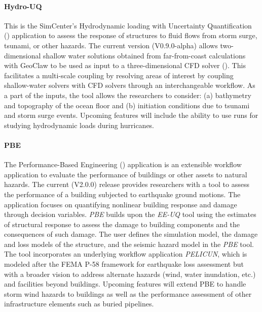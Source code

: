 \paragraph{Hydro-UQ} This is the SimCenter's Hydrodynamic loading with Uncertainty Quantification () application to assess the response of structures to fluid flows from storm surge, tsunami, or other hazards. The current version (V0.9.0-alpha) allows two-dimensional shallow water solutions obtained from far-from-coast calculations with GeoClaw  to be used as input to a three-dimensional CFD solver (). This facilitates a multi-scale coupling by resolving areas of interest by coupling shallow-water solvers with CFD solvers through an interchangeable workflow. As a part of the inputs, the tool allows the researchers to consider: (a) bathymetry and topography of the ocean floor and (b) initiation conditions due to tsunami and storm surge events. Upcoming features will include the ability to use  runs for studying hydrodynamic loads during hurricanes.

\paragraph{PBE} The Performance-Based Engineering () application is an extensible workflow application to evaluate the performance of buildings or other assets to natural hazards. The current (V2.0.0) release provides researchers with a tool to assess the performance of a building subjected to earthquake ground motions. The application focuses on quantifying nonlinear building response and damage through decision variables. \emph{PBE} builds upon the \emph{EE-UQ} tool using the estimates of structural response to assess the damage to building components and the consequences of such damage. The user defines the simulation model, the damage and loss models of the structure, and the seismic hazard model in the \emph{PBE} tool. The tool incorporates an underlying workflow application \emph{PELICUN}, which is modeled after the FEMA P-58 framework for earthquake loss assessment but with a broader vision to address alternate hazards (wind, water inundation, etc.) and facilities beyond buildings. Upcoming features will extend PBE to handle storm wind hazards to buildings as well as the performance assessment of other infrastructure elements such as buried pipelines.

